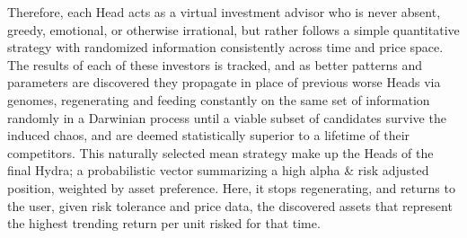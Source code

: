 \documentclass[11pt, a4paper]{awesome-cv}
\begin{document}
\begin{cvletter}
Therefore, each Head acts as a virtual investment advisor who is never absent,
greedy, emotional, or otherwise irrational, but rather follows a simple
quantitative strategy with randomized information consistently across time and
price space. The results of each of these investors is tracked, and as better patterns and parameters are discovered they propagate in place of previous worse Heads via genomes, regenerating and feeding constantly on the same set of information randomly in a Darwinian process until a viable subset of candidates survive the induced chaos, and are deemed statistically superior to a lifetime of their competitors. This naturally selected mean strategy make up the Heads of the final Hydra; a probabilistic vector summarizing a high alpha \& risk adjusted position, weighted by asset preference. Here, it stops regenerating, and returns to the user, given risk tolerance and price data, the discovered assets that represent the highest trending return per unit risked for that time.


\end{cvletter}
\end{document}
